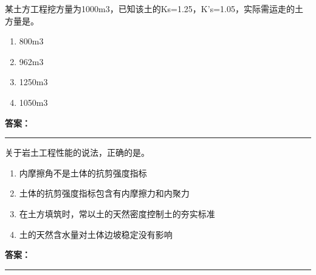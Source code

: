 \documentclass[UTF8,fontset=fandol,11pt]{ctexart}
\newcommand{\answerline}{\textcolor{answerred}{\rule{2.4cm}{0.7pt}}}
\begin{document}
\begin{quizbox}[title={乱序第 103 题｜第一章土方工程}]

某土方工程挖方量为1000m3，已知该土的Ks=1.25，K’s=1.05，实际需运走的土方量是。\\

\begin{enumerate}[label=\Alph*.]

\item 800m3

\item 962m3

\item 1250m3

\item 1050m3

\end{enumerate}

\textbf{\textcolor{answerred}{答案：}} \answerline

\end{quizbox}

\vspace{0.2em}

\begin{quizbox}[title={乱序第 104 题｜第一章土方工程}]

关于岩土工程性能的说法，正确的是。\\

\begin{enumerate}[label=\Alph*.]

\item 内摩擦角不是土体的抗剪强度指标

\item 土体的抗剪强度指标包含有内摩擦力和内聚力

\item 在土方填筑时，常以土的天然密度控制土的夯实标准

\item 土的天然含水量对土体边坡稳定没有影响

\end{enumerate}

\textbf{\textcolor{answerred}{答案：}} \answerline

\end{quizbox}

\vspace{0.2em}
\end{document}
